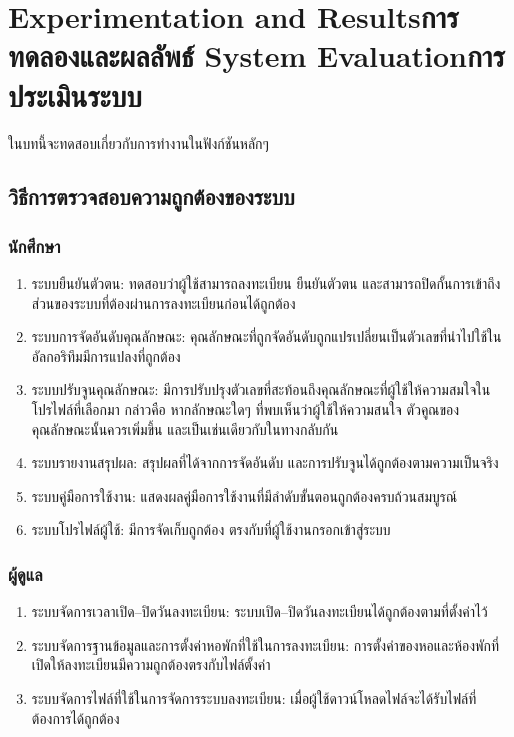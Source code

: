 \chapter{\ifproject%
\ifenglish Experimentation and Results\else การทดลองและผลลัพธ์\fi
\else%
\ifenglish System Evaluation\else การประเมินระบบ\fi
\fi}

ในบทนี้จะทดสอบเกี่ยวกับการทำงานในฟังก์ชันหลักๆ

\section{วิธีการตรวจสอบความถูกต้องของระบบ}
\subsection{นักศึกษา}
\begin{enumerate}
    \item ระบบยืนยันตัวตน: ทดสอบว่าผู้ใช้สามารถลงทะเบียน ยืนยันตัวตน และสามารถปิดกั้นการเข้าถึงส่วนของระบบที่ต้องผ่านการลงทะเบียนก่อนได้ถูกต้อง
    \item ระบบการจัดอันดับคุณลักษณะ: คุณลักษณะที่ถูกจัดอันดับถูกแปรเปลี่ยนเป็นตัวเลขที่นำไปใช้ในอัลกอริทึมมีการแปลงที่ถูกต้อง
    \item ระบบปรับจูนคุณลักษณะ: มีการปรับปรุงตัวเลขที่สะท้อนถึงคุณลักษณะที่ผู้ใช้ให้ความสมใจในโปรไฟล์ที่เลือกมา
            กล่าวคือ หากลักษณะใดๆ ที่พบเห็นว่าผู้ใช้ให้ความสนใจ ตัวคูณของคุณลักษณะนั้นควรเพิ่มขึ้น และเป็นเช่นเดียวกับในทางกลับกัน
    \item ระบบรายงานสรุปผล: สรุปผลที่ได้จากการจัดอันดับ และการปรับจูนได้ถูกต้องตามความเป็นจริง
    \item ระบบคู่มือการใช้งาน: แสดงผลคู่มือการใช้งานที่มีลำดับขั้นตอนถูกต้องครบถ้วนสมบูรณ์
    \item ระบบโปรไฟล์ผู้ใช้: มีการจัดเก็บถูกต้อง ตรงกับที่ผู้ใช้งานกรอกเข้าสู่ระบบ
\end{enumerate}

\subsection{ผู้ดูแล}
\begin{enumerate}
    \item ระบบจัดการเวลาเปิด--ปิดวันลงทะเบียน: ระบบเปิด--ปิดวันลงทะเบียนได้ถูกต้องตามที่ตั้งค่าไว้
    \item ระบบจัดการฐานข้อมูลและการตั้งค่าหอพักที่ใช้ในการลงทะเบียน: การตั้งค่าของหอและห้องพักที่เปิดให้ลงทะเบียนมีความถูกต้องตรงกับไฟล์ตั้งค่า
    \item ระบบจัดการไฟล์ที่ใช้ในการจัดการระบบลงทะเบียน: เมื่อผู้ใช้ดาวน์โหลดไฟล์จะได้รับไฟล์ที่ต้องการได้ถูกต้อง
\end{enumerate}

